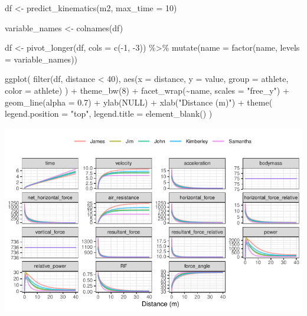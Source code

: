 \documentclass[fleqn,10pt,lineno]{wlpeerj} %
\newenvironment{Shaded}{\begin{snugshade}}{\end{snugshade}}
\newcommand{\AttributeTok}[1]{\textcolor[rgb]{0.77,0.63,0.00}{#1}}
\newcommand{\ConstantTok}[1]{\textcolor[rgb]{0.00,0.00,0.00}{#1}}
\newcommand{\DecValTok}[1]{\textcolor[rgb]{0.00,0.00,0.81}{#1}}
\newcommand{\FloatTok}[1]{\textcolor[rgb]{0.00,0.00,0.81}{#1}}
\newcommand{\FunctionTok}[1]{\textcolor[rgb]{0.00,0.00,0.00}{#1}}
\newcommand{\NormalTok}[1]{#1}
\newcommand{\OtherTok}[1]{\textcolor[rgb]{0.56,0.35,0.01}{#1}}
\newcommand{\SpecialCharTok}[1]{\textcolor[rgb]{0.00,0.00,0.00}{#1}}
\newcommand{\StringTok}[1]{\textcolor[rgb]{0.31,0.60,0.02}{#1}}
\begin{document}
\begin{Shaded}
\begin{Highlighting}[]
\NormalTok{df }\OtherTok{\textless{}{-}} \FunctionTok{predict\_kinematics}\NormalTok{(m2, }\AttributeTok{max\_time =} \DecValTok{10}\NormalTok{)}

\NormalTok{variable\_names }\OtherTok{\textless{}{-}} \FunctionTok{colnames}\NormalTok{(df)}

\NormalTok{df }\OtherTok{\textless{}{-}} \FunctionTok{pivot\_longer}\NormalTok{(df, }\AttributeTok{cols =} \FunctionTok{c}\NormalTok{(}\SpecialCharTok{{-}}\DecValTok{1}\NormalTok{, }\SpecialCharTok{{-}}\DecValTok{3}\NormalTok{)) }\SpecialCharTok{\%\textgreater{}\%}
  \FunctionTok{mutate}\NormalTok{(}\AttributeTok{name =} \FunctionTok{factor}\NormalTok{(name, }\AttributeTok{levels =}\NormalTok{ variable\_names))}

\FunctionTok{ggplot}\NormalTok{(}
  \FunctionTok{filter}\NormalTok{(df, distance }\SpecialCharTok{\textless{}} \DecValTok{40}\NormalTok{),}
  \FunctionTok{aes}\NormalTok{(}\AttributeTok{x =}\NormalTok{ distance, }\AttributeTok{y =}\NormalTok{ value, }\AttributeTok{group =}\NormalTok{ athlete, }\AttributeTok{color =}\NormalTok{ athlete)}
\NormalTok{) }\SpecialCharTok{+}
  \FunctionTok{theme\_bw}\NormalTok{(}\DecValTok{8}\NormalTok{) }\SpecialCharTok{+}
  \FunctionTok{facet\_wrap}\NormalTok{(}\SpecialCharTok{\textasciitilde{}}\NormalTok{name, }\AttributeTok{scales =} \StringTok{"free\_y"}\NormalTok{) }\SpecialCharTok{+}
  \FunctionTok{geom\_line}\NormalTok{(}\AttributeTok{alpha =} \FloatTok{0.7}\NormalTok{) }\SpecialCharTok{+}
  \FunctionTok{ylab}\NormalTok{(}\ConstantTok{NULL}\NormalTok{) }\SpecialCharTok{+}
  \FunctionTok{xlab}\NormalTok{(}\StringTok{"Distance (m)"}\NormalTok{) }\SpecialCharTok{+}
  \FunctionTok{theme}\NormalTok{(}
    \AttributeTok{legend.position =} \StringTok{"top"}\NormalTok{,}
    \AttributeTok{legend.title =} \FunctionTok{element\_blank}\NormalTok{()}
\NormalTok{  )}
\end{Highlighting}
\end{Shaded}

\begin{center}\includegraphics[width=0.9\linewidth]{paper_files/figure-latex/unnamed-chunk-12-1} \end{center}
\end{document}
